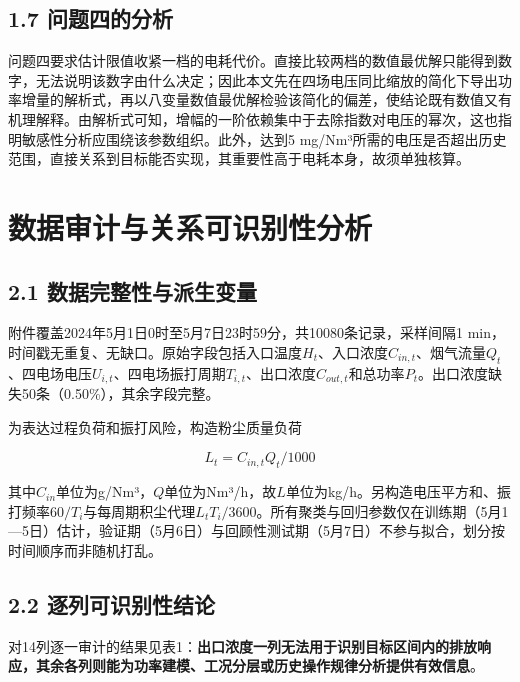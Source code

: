 \documentclass[UTF8,zihao=5,a4paper]{ctexart}
\begin{document}
\subsection*{1.7 问题四的分析}

问题四要求估计限值收紧一档的电耗代价。直接比较两档的数值最优解只能得到数字，无法说明该数字由什么决定；因此本文先在四场电压同比缩放的简化下导出功率增量的解析式，再以八变量数值最优解检验该简化的偏差，使结论既有数值又有机理解释。由解析式可知，增幅的一阶依赖集中于去除指数对电压的幂次，这也指明敏感性分析应围绕该参数组织。此外，达到5 mg/Nm³所需的电压是否超出历史范围，直接关系到目标能否实现，其重要性高于电耗本身，故须单独核算。

\section{数据审计与关系可识别性分析}

\subsection*{2.1 数据完整性与派生变量}

附件覆盖2024年5月1日0时至5月7日23时59分，共10080条记录，采样间隔1 min，时间戳无重复、无缺口。原始字段包括入口温度$H_t$、入口浓度$C_{in,t}$、烟气流量$Q_t$、四电场电压$U_{i,t}$、四电场振打周期$T_{i,t}$、出口浓度$C_{out,t}$和总功率$P_t$。出口浓度缺失50条（0.50\%），其余字段完整。

为表达过程负荷和振打风险，构造粉尘质量负荷

\begin{equation}
L_t=C_{in,t}Q_t/1000
\end{equation}

其中$C_{in}$单位为g/Nm³，$Q$单位为Nm³/h，故$L$单位为kg/h。另构造电压平方和、振打频率$60/T_i$与每周期积尘代理$L_tT_i/3600$。所有聚类与回归参数仅在训练期（5月1—5日）估计，验证期（5月6日）与回顾性测试期（5月7日）不参与拟合，划分按时间顺序而非随机打乱。

\subsection*{2.2 逐列可识别性结论}

对14列逐一审计的结果见表1：\textbf{出口浓度一列无法用于识别目标区间内的排放响应，其余各列则能为功率建模、工况分层或历史操作规律分析提供有效信息}。
\end{document}
